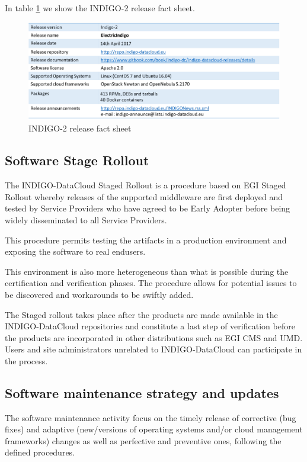 \documentclass{article}
\begin{document}
In table \ref{tab:2} we show the INDIGO-2 release fact sheet.

\begin{figure}
  \centering
  \includegraphics[width=\textwidth]{./figs/TableII.pdf}
  \caption{INDIGO-2 release fact sheet}
  \label{tab:2}
\end{figure}

\subsection{Software Stage Rollout}

The INDIGO-DataCloud Staged Rollout is a procedure based on EGI\cite{EGI} Staged Rollout whereby releases of the supported middleware are first deployed and tested by Service Providers who have agreed to be Early Adopter before being widely
disseminated to all Service Providers.

This procedure permits testing the artifacts in a production environment and exposing  the software to real endusers.

This environment is also more heterogeneous than what is possible during the certification and verification phases. The procedure  allows for potential issues to be discovered and workarounds to be swiftly added.

The Staged rollout takes place after the products are made available in the INDIGO-DataCloud repositories and constitute a last step of verification before the products are incorporated in other distributions such as EGI CMS and UMD. Users and site administrators unrelated to INDIGO-DataCloud can participate in the process.

\subsection{Software maintenance strategy and updates}

The software maintenance activity focus on the timely release of corrective (bug fixes) and adaptive (new/versions of operating systems and/or cloud management frameworks) changes as well as perfective and preventive ones, following the defined procedures.
\end{document}
